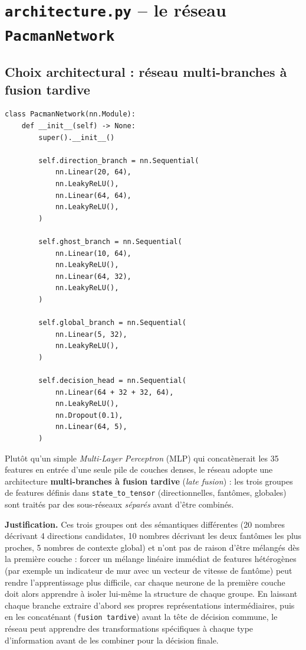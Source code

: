 \documentclass[a4paper,12pt]{article}
\begin{document}
\newpage
\section{\texttt{architecture.py} -- le réseau \texttt{PacmanNetwork}}

\subsection{Choix architectural : réseau multi-branches à fusion tardive}
\label{sec:architecture-forward}

\begin{lstlisting}
class PacmanNetwork(nn.Module):
    def __init__(self) -> None:
        super().__init__()

        self.direction_branch = nn.Sequential(
            nn.Linear(20, 64),
            nn.LeakyReLU(),
            nn.Linear(64, 64),
            nn.LeakyReLU(),
        )

        self.ghost_branch = nn.Sequential(
            nn.Linear(10, 64),
            nn.LeakyReLU(),
            nn.Linear(64, 32),
            nn.LeakyReLU(),
        )

        self.global_branch = nn.Sequential(
            nn.Linear(5, 32),
            nn.LeakyReLU(),
        )

        self.decision_head = nn.Sequential(
            nn.Linear(64 + 32 + 32, 64),
            nn.LeakyReLU(),
            nn.Dropout(0.1),
            nn.Linear(64, 5),
        )
\end{lstlisting}

Plutôt qu'un simple \emph{Multi-Layer Perceptron} (MLP) qui concatènerait
les 35 features en entrée d'une seule pile de couches denses, le réseau
adopte une architecture \textbf{multi-branches à fusion tardive}
(\emph{late fusion}) : les trois groupes de features définis dans
\texttt{state\_to\_tensor} (directionnelles, fantômes, globales) sont
traités par des sous-réseaux \emph{séparés} avant d'être combinés.

\textbf{Justification.} Ces trois groupes ont des sémantiques différentes
(20 nombres décrivant 4 directions candidates, 10 nombres décrivant les
deux fantômes les plus proches, 5 nombres de contexte global) et
n'ont pas de raison d'être mélangés dès la première couche : forcer un
mélange linéaire immédiat de features hétérogènes (par exemple un
indicateur de mur avec un vecteur de vitesse de fantôme) peut rendre
l'apprentissage plus difficile, car chaque neurone de la première couche
doit alors apprendre à isoler lui-même la structure de chaque groupe. En
laissant chaque branche extraire d'abord ses propres représentations
intermédiaires, puis en les concaténant (\texttt{fusion tardive}) avant la
tête de décision commune, le réseau peut apprendre des transformations
spécifiques à chaque type d'information avant de les combiner pour la
décision finale.
\end{document}
